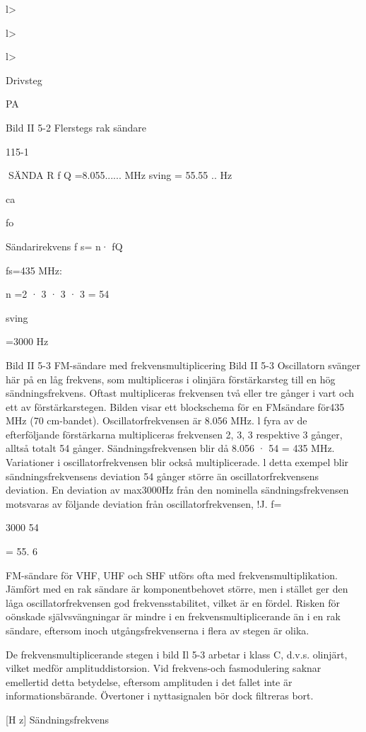 l>

l>

l>

Drivsteg

PA

Bild II 5-2 Flerstegs rak sändare

115-1

SÄNDA R
f Q =8.055...... MHz
sving = 55.55 .. Hz

ca

fo

Sändarirekvens f s= n· fQ

fs=435 MHz:

n =2 · 3 · 3 · 3 = 54

sving

=3000 Hz

Bild II 5-3 FM-sändare med frekvensmultiplicering
Bild II 5-3
Oscillatorn svänger här på en låg frekvens,
som multipliceras i olinjära förstärkarsteg till
en hög sändningsfrekvens. Oftast multipliceras frekvensen två eller tre gånger i vart
och ett av förstärkarstegen.
Bilden visar ett blockschema för en FMsändare för435 MHz (70 cm-bandet). Oscillatorfrekvensen är 8.056 MHz. l fyra av de
efterföljande förstärkarna multipliceras frekvensen 2, 3, 3 respektive 3 gånger, alltså
totalt 54 gånger. Sändningsfrekvensen blir
då 8.056 · 54 = 435 MHz.
Variationer i oscillatorfrekvensen blir också multiplicerade. l detta exempel blir sändningsfrekvensens deviation 54 gånger större än oscillatorfrekvensens deviation. En
deviation av max3000Hz från den nominella sändningsfrekvensen motsvaras av följande deviation från oscillatorfrekvensen,
!J. f=

3000
54

= 55. 6

FM-sändare för VHF, UHF och SHF utförs ofta med frekvensmultiplikation. Jämfört med en rak sändare är komponentbehovet större, men i stället ger den låga oscillatorfrekvensen god frekvensstabilitet, vilket
är en fördel. Risken för oönskade självsvängningar är mindre i en frekvensmultiplicerande än i en rak sändare, eftersom inoch utgångsfrekvenserna i flera av stegen
är olika.

De frekvensmultiplicerande stegen i bild
Il 5-3 arbetar i klass C, d.v.s. olinjärt, vilket
medför amplituddistorsion. Vid frekvens-och
fasmodulering saknar emellertid detta betydelse, eftersom amplituden i det fallet inte är
informationsbärande. Övertoner i nyttasignalen bör dock filtreras bort.

[H z]
Sändningsfrekvens

